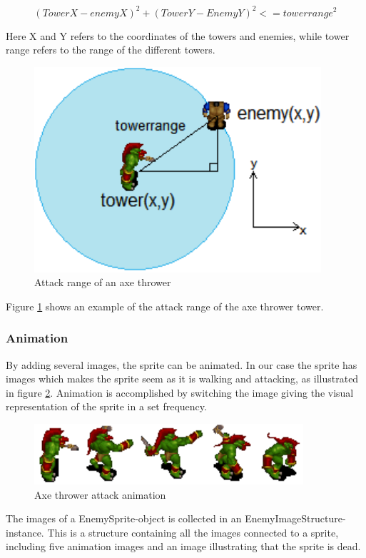 \begin{equation}\label{eq:targetInRange}
	(TowerX - enemyX)^2 +(TowerY - EnemyY)^2 <= tower range^2
\end{equation}

Here X and Y refers to the coordinates of the towers and enemies, while tower range refers to the range of the different towers.

\begin{figure}[htbp]
	\centering
		\includegraphics{main/figures/range}
		\caption{Attack range of an axe thrower}
	\label{fig:range}
\end{figure}

Figure \ref{fig:range} shows an example of the attack range of the axe thrower tower.


\subsubsection{Animation}

By adding several images, the sprite can be animated. In our case the sprite has images which makes the sprite seem as it is walking and attacking, as illustrated in figure \ref{fig:axeanimation}. Animation is accomplished by switching the image giving the visual representation of the sprite in a set frequency. 

\begin{figure}[htbp]
	\centering
		\includegraphics{main/figures/axeanimation}
		\caption{Axe thrower attack animation}
	\label{fig:axeanimation}
\end{figure}


The images of a EnemySprite-object is collected in an EnemyImageStructure-instance. This is a structure containing all the images connected to a sprite, including five animation images and an image illustrating that the sprite is dead.

